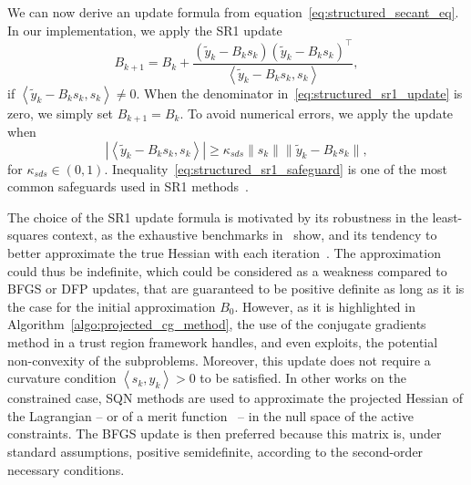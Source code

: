 \documentclass{article}
\numberwithin{equation}{section}
\newcommand{\inner}[2]{\left\langle {#1} , {#2} \right\rangle} %
\theoremstyle{plain}
\begin{document}
	We can now derive an update formula from equation~\eqref{eq:structured_secant_eq}. In our implementation, we apply the SR1 update
	\begin{equation}\label{eq:structured_sr1_update}
		B_{k+1} = B_k + \dfrac{(\tilde{y}_k-B_ks_k)(\tilde{y}_k-B_ks_k)^\top}{\inner{\tilde{y}_k-B_ks_k}{s_k}},
	\end{equation}
	if $\inner{\tilde{y}_k-B_ks_k}{s_k} \neq 0$. When the denominator in~\eqref{eq:structured_sr1_update} is zero, we simply set $B_{k+1}=B_k$. To avoid numerical errors, we apply the update when
	\begin{equation}\label{eq:structured_sr1_safeguard}
		\left|\inner{\tilde{y}_k-B_ks_k}{s_k}\right| \ge \kappa_{sds}\|s_k\|\|\tilde{y}_k-B_ks_k\|,
	\end{equation}
	for $\kappa_{sds} \in (0,1)$. Inequality~\eqref{eq:structured_sr1_safeguard} is one of the most common safeguards used in SR1 methods~\cite[Section~6.2]{nocedalwright:2006}.
	
	The choice of the SR1 update formula is motivated by its robustness in the least-squares context, as the exhaustive benchmarks in~\cite{lucksan-etal:2019} show, and its tendency to better approximate the true Hessian with each iteration~\cite{conn-etal:1991a}. The approximation could thus be indefinite, which could be considered as a weakness compared to BFGS or DFP updates, that are guaranteed to be positive definite as long as it is the case for the initial approximation $B_0$. However, as it is highlighted in Algorithm~\ref{algo:projected_cg_method}, the use of the conjugate gradients method in a trust region framework handles, and even exploits, the potential non-convexity of the subproblems. Moreover, this update does not require a curvature condition $\inner{s_k}{y_k} > 0$ to be satisfied. In other works on the constrained case, SQN methods are used to approximate the projected Hessian of the Lagrangian \cite{tjoabiegler:1991} -- or of a merit function~\cite{amiribartels:1989} -- in the null space of the active constraints. The BFGS update is then preferred because this matrix is, under standard assumptions, positive semidefinite, according to the second-order necessary conditions.
	
\end{document}
